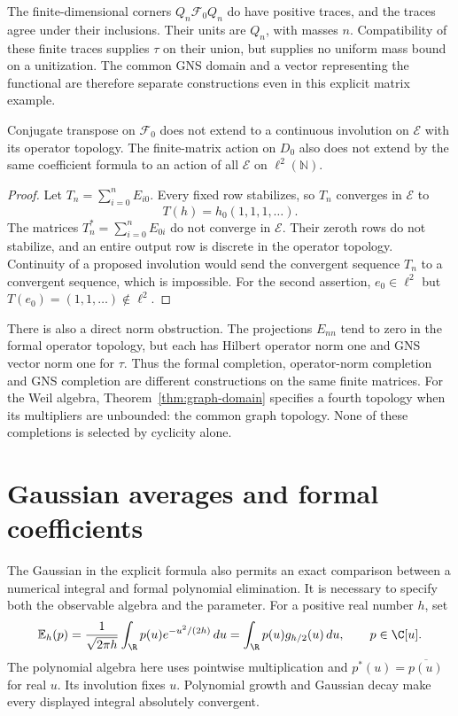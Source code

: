 The finite-dimensional corners $Q_n\mathscr F_0Q_n$ do have positive
traces, and the traces agree under their inclusions.  Their units are
$Q_n$, with masses $n$.  Compatibility of these finite traces supplies
$\tau$ on their union, but supplies no uniform mass bound on a unitization.
The common GNS domain and a vector representing the functional are
therefore separate constructions even in this explicit matrix example.

\begin{proposition}
\label{prop:weil-formal-adjoint}
Conjugate transpose on $\mathscr F_0$ does not extend to a continuous
involution on $\mathscr E$ with its operator topology.
The finite-matrix action on $D_0$ also does not extend by the same
coefficient formula to an action of all $\mathscr E$ on
$\ell^2(\mathbb N)$.
\end{proposition}
\begin{proof}
Let $T_n=\sum_{i=0}^nE_{i0}$.
Every fixed row stabilizes, so $T_n$ converges in $\mathscr E$ to
\[
 T(h)=h_0(1,1,1,\ldots).
\]
The matrices $T_n^*=\sum_{i=0}^nE_{0i}$ do not converge in
$\mathscr E$.  Their zeroth rows do not stabilize, and an entire output
row is discrete in the operator topology.  Continuity of a proposed
involution would send the convergent sequence $T_n$ to a convergent
sequence, which is impossible.
For the second assertion, $e_0\in\ell^2$ but
$T(e_0)=(1,1,\ldots)\notin\ell^2$.
\end{proof}

There is also a direct norm obstruction.
The projections $E_{nn}$ tend to zero in the formal operator topology,
but each has Hilbert operator norm one and GNS vector norm one for
$\tau$.  Thus the formal completion, operator-norm completion and
GNS completion are different constructions on the same finite matrices.
For the Weil algebra, Theorem~\ref{thm:graph-domain} specifies a fourth
topology when its multipliers are unbounded: the common graph topology.
None of these completions is selected by cyclicity alone.

\section{Gaussian averages and formal coefficients}
\label{sec:weil-gaussian-coefficients}

The Gaussian in the explicit formula also permits an exact comparison
between a numerical integral and formal polynomial elimination.
It is necessary to specify both the observable algebra and the parameter.
For a positive real number $h$, set
\[
 \mathbb E_h(p)=\frac1{\sqrt{2\pi h}}
       \int_{\R}p(u)e^{-u^2/(2h)}\,du
       =\int_{\R}p(u)g_{h/2}(u)\,du,
 \qquad p\in\C[u].
\]
The polynomial algebra here uses pointwise multiplication and
$p^*(u)=\overline{p(u)}$ for real $u$.
Its involution fixes $u$.  Polynomial growth and Gaussian decay make
every displayed integral absolutely convergent.

